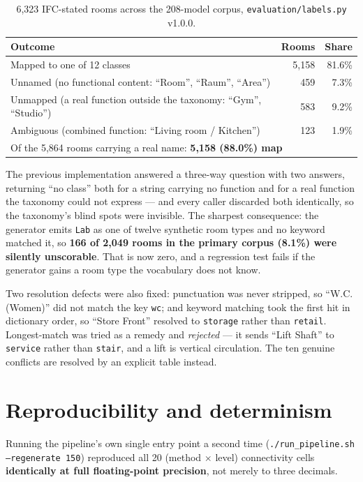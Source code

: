 \documentclass[11pt,a4paper]{article}
\newcommand{\code}[1]{\texttt{\small #1}}
\begin{document}
\begin{table}[ht]
\centering
\small
\begin{tabular}{lrr}
\toprule
Outcome & Rooms & Share \\
\midrule
Mapped to one of 12 classes & 5{,}158 & 81.6\% \\
Unnamed (no functional content: ``Room'', ``Raum'', ``Area'') & 459 & 7.3\% \\
Unmapped (a real function outside the taxonomy: ``Gym'', ``Studio'') & 583 & 9.2\% \\
Ambiguous (combined function: ``Living room / Kitchen'') & 123 & 1.9\% \\
\midrule
\multicolumn{3}{l}{Of the 5{,}864 rooms carrying a real name: \textbf{5{,}158 (88.0\%) map}} \\
\bottomrule
\end{tabular}
\caption{6{,}323 IFC-stated rooms across the 208-model corpus,
\code{evaluation/labels.py} v1.0.0.}
\end{table}

\noindent
The previous implementation answered a three-way question with two answers,
returning ``no class'' both for a string carrying no function and for a real
function the taxonomy could not express --- and every caller discarded both
identically, so the taxonomy's blind spots were invisible. The sharpest
consequence: the generator emits \code{Lab} as one of twelve synthetic room
types and no keyword matched it, so \textbf{166 of 2{,}049 rooms in the primary
corpus (8.1\%) were silently unscorable}. That is now zero, and a regression
test fails if the generator gains a room type the vocabulary does not know.

Two resolution defects were also fixed: punctuation was never stripped, so
``W.C. (Women)'' did not match the key \code{wc}; and keyword matching took the
first hit in dictionary order, so ``Store Front'' resolved to \code{storage}
rather than \code{retail}. Longest-match was tried as a remedy and
\emph{rejected} --- it sends ``Lift Shaft'' to \code{service} rather than
\code{stair}, and a lift is vertical circulation. The ten genuine conflicts are
resolved by an explicit table instead.

\section{Reproducibility and determinism}
\label{sec:repro}

Running the pipeline's own single entry point a second time
(\code{./run\_pipeline.sh --regenerate 150}) reproduced all 20
(method $\times$ level) connectivity cells \textbf{identically at full
floating-point precision}, not merely to three decimals.
\end{document}
